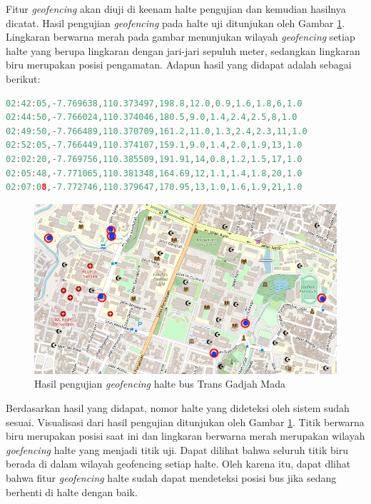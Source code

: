 Fitur \textit{geofencing} akan diuji di keenam halte pengujian dan kemudian hasilnya dicatat. Hasil pengujian \textit{geofencing} pada halte uji ditunjukan oleh Gambar \ref{Fig: geofencing-2}. Lingkaran berwarna merah pada gambar menunjukan wilayah \textit{geofencing} setiap halte yang berupa lingkaran dengan jari-jari sepuluh meter, sedangkan lingkaran biru merupakan posisi pengamatan. Adapun hasil yang didapat adalah sebagai berikut:

\vspace{0.3cm}
\begin{lstlisting}[language=c]
02:42:05,-7.769638,110.373497,198.8,12.0,0.9,1.6,1.8,6,1.0
02:44:50,-7.766024,110.374046,180.5,9.0,1.4,2.4,2.5,8,1.0
02:49:50,-7.766489,110.370709,161.2,11.0,1.3,2.4,2.3,11,1.0
02:52:05,-7.766449,110.374107,159.1,9.0,1.4,2.0,1.9,13,1.0
02:02:20,-7.769756,110.385509,191.91,14,0.8,1.2,1.5,17,1.0
02:05:48,-7.771065,110.381348,164.69,12,1.1,1.4,1.8,20,1.0
02:07:08,-7.772746,110.379647,170.95,13,1.0,1.6,1.9,21,1.0
\end{lstlisting}

\begin{figure}[H]
	\centering
	\includegraphics[width=12cm]{contents/chapter-4/geofencing/halte.png}
	\caption{Hasil pengujian \textit{geofencing} halte bus Trans Gadjah Mada}
	\label{Fig: geofencing-2}
\end{figure}

Berdasarkan hasil yang didapat, nomor halte yang dideteksi oleh sistem sudah sesuai. Visualisasi dari hasil pengujian ditunjukan oleh Gambar \ref{Fig: geofencing-2}. Titik berwarna biru merupakan posisi saat ini dan lingkaran berwarna merah merupakan wilayah \textit{goefencing} halte yang menjadi titik uji. Dapat dilihat bahwa seluruh titik biru berada di dalam wilayah geofencing setiap halte. Oleh karena itu, dapat dlihat bahwa fitur \textit{geofencing} halte sudah dapat mendeteksi posisi bus jika sedang berhenti di halte dengan baik.

